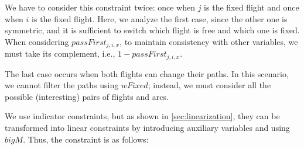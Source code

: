 \documentclass[../thesis.tex]{subfiles}
\begin{document}
We have to consider this constraint twice: once when $j$ is the fixed flight and once when $i$ is the fixed flight. Here, we analyze the first case, since the other one is symmetric, and it is sufficient to switch which flight is free and which one is fixed.
When considering \( passFirst_{j,i,x} \), to maintain consistency with other variables, we must take its complement, i.e., \( 1 - passFirst_{j,i,x} \).\newline
{}

The last case occurs when both flights can change their paths. In this scenario, we cannot filter the paths using $wFixed$; instead, we must consider all the possible (interesting) pairs of flights and arcs.

We use indicator constraints, but as shown in \ref{sec:linearization}, they can be transformed into linear constraints by introducing auxiliary variables and using $bigM$.
Thus, the constraint is as follows:\newline
{}
\end{document}
